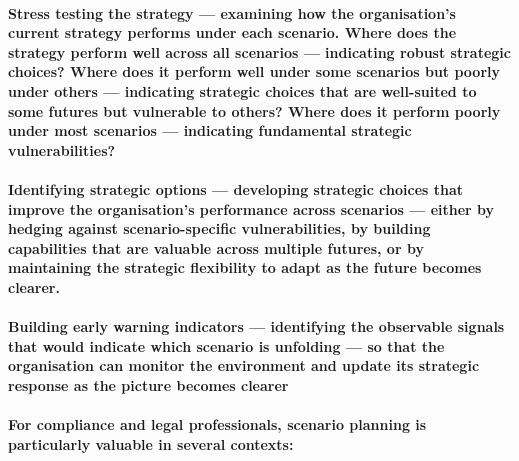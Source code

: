 \paragraph{\textbf{Stress testing the strategy} — examining how the organisation's current strategy performs under each scenario. Where does the strategy perform well across all scenarios — indicating robust strategic choices? Where does it perform well under some scenarios but poorly under others — indicating strategic choices that are well-suited to some futures but vulnerable to others? Where does it perform poorly under most scenarios — indicating fundamental strategic vulnerabilities?}
\paragraph{\textbf{Identifying strategic options} — developing strategic choices that improve the organisation's performance across scenarios — either by hedging against scenario-specific vulnerabilities, by building capabilities that are valuable across multiple futures, or by maintaining the strategic flexibility to adapt as the future becomes clearer.}
\paragraph{\textbf{Building early warning indicators} — identifying the observable signals that would indicate which scenario is unfolding — so that the organisation can monitor the environment and update its strategic response as the picture becomes clearer}
\paragraph{For compliance and legal professionals, scenario planning is particularly valuable in several contexts:}
\begin{itemize}
\end{itemize}

